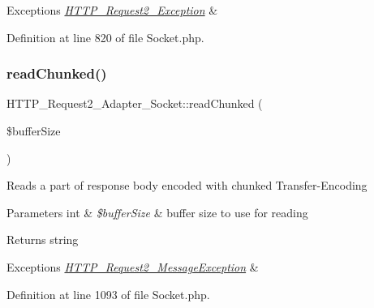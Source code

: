 \begin{DoxyExceptions}{Exceptions}
{\em \hyperlink{classHTTP__Request2__Exception}{H\+T\+T\+P\+\_\+\+Request2\+\_\+\+Exception}} & \\
\hline
\end{DoxyExceptions}


Definition at line 820 of file Socket.\+php.

\hypertarget{classHTTP__Request2__Adapter__Socket_a2a5a784d7631133a5713476ee96c62ed}{}\label{classHTTP__Request2__Adapter__Socket_a2a5a784d7631133a5713476ee96c62ed} 
\subsubsection{\texorpdfstring{read\+Chunked()}{readChunked()}}
{\footnotesize\ttfamily H\+T\+T\+P\+\_\+\+Request2\+\_\+\+Adapter\+\_\+\+Socket\+::read\+Chunked (\begin{DoxyParamCaption}\item[{}]{\$buffer\+Size }\end{DoxyParamCaption})\hspace{0.3cm}{\ttfamily [protected]}}

Reads a part of response body encoded with chunked Transfer-\/\+Encoding


\begin{DoxyParams}[1]{Parameters}
int & {\em \$buffer\+Size} & buffer size to use for reading\\
\hline
\end{DoxyParams}
\begin{DoxyReturn}{Returns}
string 
\end{DoxyReturn}

\begin{DoxyExceptions}{Exceptions}
{\em \hyperlink{classHTTP__Request2__MessageException}{H\+T\+T\+P\+\_\+\+Request2\+\_\+\+Message\+Exception}} & \\
\hline
\end{DoxyExceptions}


Definition at line 1093 of file Socket.\+php.

\hypertarget{classHTTP__Request2__Adapter__Socket_ace322a437e3d44b48bd44c2d452e0ad0}{}\label{classHTTP__Request2__Adapter__Socket_ace322a437e3d44b48bd44c2d452e0ad0} 
